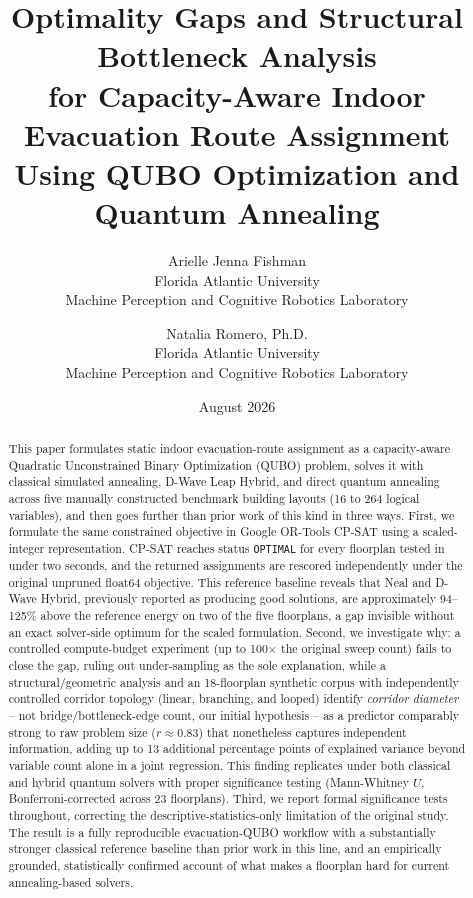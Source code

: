 \documentclass[11pt]{article}
\title{\textbf{Optimality Gaps and Structural Bottleneck Analysis \\
for Capacity-Aware Indoor Evacuation Route Assignment \\
Using QUBO Optimization and Quantum Annealing}}
\author{
Arielle Jenna Fishman \\
\small Florida Atlantic University \\
\small Machine Perception and Cognitive Robotics Laboratory
\and
Natalia Romero, Ph.D. \\
\small Florida Atlantic University \\
\small Machine Perception and Cognitive Robotics Laboratory
}
\date{August 2026}
\begin{document}
\maketitle

\begin{abstract}
This paper formulates static indoor evacuation-route assignment as a capacity-aware Quadratic Unconstrained Binary Optimization (QUBO) problem, solves it with classical simulated annealing, D-Wave Leap Hybrid, and direct quantum annealing across five manually constructed benchmark building layouts (16 to 264 logical variables), and then goes further than prior work of this kind in three ways. First, we formulate the same constrained objective in Google OR-Tools CP-SAT using a scaled-integer representation. CP-SAT reaches status \texttt{OPTIMAL} for every floorplan tested in under two seconds, and the returned assignments are rescored independently under the original unpruned float64 objective. This reference baseline reveals that Neal and D-Wave Hybrid, previously reported as producing good solutions, are approximately 94--125\% above the reference energy on two of the five floorplans, a gap invisible without an exact solver-side optimum for the scaled formulation. Second, we investigate why: a controlled compute-budget experiment (up to 100$\times$ the original sweep count) fails to close the gap, ruling out under-sampling as the sole explanation, while a structural/geometric analysis and an 18-floorplan synthetic corpus with independently controlled corridor topology (linear, branching, and looped) identify \emph{corridor diameter} -- not bridge/bottleneck-edge count, our initial hypothesis -- as a predictor comparably strong to raw problem size ($r\approx0.83$) that nonetheless captures independent information, adding up to 13 additional percentage points of explained variance beyond variable count alone in a joint regression. This finding replicates under both classical and hybrid quantum solvers with proper significance testing (Mann-Whitney $U$, Bonferroni-corrected across 23 floorplans). Third, we report formal significance tests throughout, correcting the descriptive-statistics-only limitation of the original study. The result is a fully reproducible evacuation-QUBO workflow with a substantially stronger classical reference baseline than prior work in this line, and an empirically grounded, statistically confirmed account of what makes a floorplan hard for current annealing-based solvers.
\end{abstract}
\end{document}
